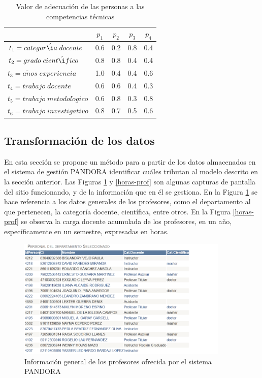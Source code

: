 \begin{table}[H]
	\centering
	\caption{Valor de adecuación de las personas a las competencias técnicas}\label{pct-carga}
	\begin{tabular}{|l|c|c|c|c|}
		\hline
		\thead{$F_t(p,t)$} & $p_1$ & $p_2$ & $p_3$ & $p_4$ \\ \hline
		$t_1=categor\acute{\i}a\;docente$  	   &  0.6  &  0.2  &  0.8 &  0.4 \\ \hline
		$t_2=grado\;cient\acute{\i}fico$      &  0.8  &  0.8  &  0.4 &  0.4 \\ \hline
		$t_3=a\tilde{n}os\;experiencia$  	   &  1.0  &  0.4  &  0.4 &  0.6 \\ \hline
		$t_4=trabajo\;docente$     & 0.6 & 0.6 & 0.4 & 0.3 \\ \hline
		$t_5=trabajo\;metodol\acute{o}gico$     & 0.6 & 0.8 & 0.3 & 0.8 \\ \hline
		$t_6=trabajo\;investigativo$     & 0.8 & 0.7 & 0.5 & 0.6 \\ \hline
	\end{tabular}
\end{table}

\subsection{Transformación de los datos}\label{sec:tran_docencia}

 En esta sección se propone un método para a partir de los datos almacenados en el sistema de gestión PANDORA identificar cuáles tributan al modelo descrito en la sección anterior. Las Figuras \ref{info-gen-prof} y \ref{horas-prof} son algunas capturas de pantalla del sitio funcionando, y de la información que en él se gestiona. En la Figura \ref{info-gen-prof} se hace referencia a los datos generales de los profesores, como el departamento al que pertenecen, la categoría docente, científica, entre otros. En la Figura \ref{horas-prof} se observa la carga docente acumulada de los profesores, en un año, específicamente en un semestre, expresadas en horas.

\begin{figure} [H]
	\centering
	\includegraphics[width=0.9\textwidth]{figuras/catDocCient.png}
	\caption{Información general de los profesores ofrecida por el sistema PANDORA} \label{info-gen-prof}
\end{figure}

